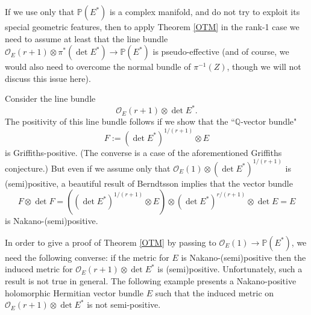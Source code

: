 \documentclass[12pt,hidelinks]{amsart}
\newcommand{\cO}{{\mathcal O}}
\newcommand{\bbP}{{\mathbb P}}
\newcommand{\bbQ}{{\mathbb Q}}
\newcommand{\tensor}{\otimes}
\begin{document}
If we use only that $\bbP(E^*)$ is a complex manifold, and do not try to exploit its special geometric features, then to apply Theorem \ref{OTM} in the rank-1 case we need to assume at least that the line bundle $\cO _E(r+1) \tensor \pi ^*(\det E^*) \to \bbP(E^*)$ is pseudo-effective (and of course, we would also need to overcome the normal bundle of $\pi ^{-1} (Z)$, though we will not discuss this issue here).

Consider the line bundle 
\[
\cO_E (r+1) \tensor \det E^*.
\]
The positivity of this line bundle follows if we show that  the ``$\bbQ$-vector bundle" 
\[
F := (\det E^*)^{1/(r+1)} \tensor E
\]
is Griffiths-positive.  (The converse is a case of the aforementioned Griffiths conjecture.)  But even if we assume only that $\cO_E (1) \tensor (\det E^*)^{1/(r+1)}$ is (semi)positive, a beautiful result of Berndtsson \cite[Theorem 7.1]{bo-annals} implies that the vector bundle 
\[
F \tensor \det F = \left ((\det E^*)^{1/(r+1)} \tensor E \right ) \tensor (\det E^*)^{r/(r+1)} \tensor \det E = E
\]
is Nakano-(semi)positive.

In order to give a proof of Theorem \ref{OTM} by passing to $\cO _E(1) \to \bbP(E^*)$, we need the following converse:  if the metric for $E$ is Nakano-(semi)positive then the induced metric for $\cO _E(r+1) \tensor \det E^*$ is (semi)positive.  Unfortunately, such a result is not true in general.  The following example presents a Nakano-positive holomorphic Hermitian vector bundle $E$ such that the induced metric on $\cO_E(r+1) \tensor \det E^*$ is not semi-positive.
\end{document}
